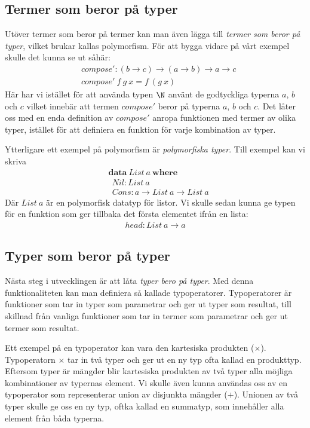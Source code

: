 \subsection{Termer som beror på typer}
Utöver termer som beror på termer kan man även lägga till \emph{termer som
beror på typer}, vilket brukar kallas polymorfism. För att bygga vidare på vårt
exempel skulle det kunna se ut såhär:
\begin{align*}
  &compose' : (b \to c) \to (a \to b) \to a \to c \\
  &compose'\ f\ g\ x = f\ (g\ x)
\end{align*}
Här har vi istället för att använda typen $\N$ använt de godtyckliga
typerna $a$, $b$ och $c$ vilket innebär att termen $compose'$ beror på typerna
$a$, $b$ och $c$. Det låter oss med en enda definition av $compose'$ anropa
funktionen med termer av olika typer, istället för att definiera en funktion
för varje kombination av typer.

Ytterligare ett exempel på polymorfism är \emph{polymorfiska typer}. Till
exempel kan vi skriva
\begin{align*}
  &\boldsymbol{data}\ List\ a\ \boldsymbol{where} \\
  &\ \ Nil : List\ a \\
  &\ \ Cons : a \to List\ a \to List\ a
\end{align*}
Där $List\ a$ är en polymorfisk datatyp för listor. Vi skulle sedan kunna ge
typen för en funktion som ger tillbaka det första elementet ifrån en lista:
\begin{align*}
  head : List\ a \to a
\end{align*}

\subsection{Typer som beror på typer}
Nästa steg i utvecklingen är att låta \emph{typer bero på typer}. Med denna
funktionaliteten kan man definiera så kallade typoperatorer. Typoperatorer är
funktioner som tar in typer som parametrar och ger ut typer som resultat, till
skillnad från vanliga funktioner som tar in termer som parametrar och ger ut
termer som resultat.

Ett exempel på en typoperator kan vara den kartesiska produkten ($\times$).
Typoperatorn $\times$ tar in två typer och ger ut en ny typ ofta kallad en
produkttyp. Eftersom typer är mängder blir kartesiska produkten av två typer
alla möjliga kombinationer av typernas element. Vi skulle även kunna användas
oss av en typoperator som representerar union av disjunkta mängder ($+$).
Unionen av två typer skulle ge oss en ny typ, oftka kallad en summatyp, som
innehåller alla element från båda typerna.

